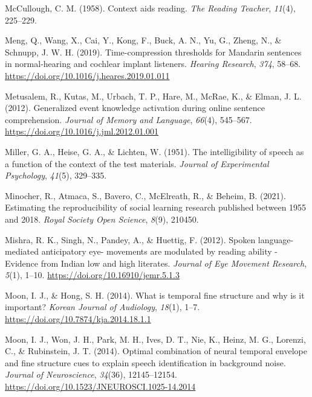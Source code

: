 \documentclass[a4paper, nobind]{templates/ociamthesis}
\newlength{\cslhangindent}
\newenvironment{CSLReferences}[2] %
 {%
  \setlength{\parindent}{0pt}
  \ifodd #1
  \let\oldpar\par
  \def\par{\hangindent=\cslhangindent\oldpar}
  \fi
  \setlength{\parskip}{1mm}
  \setlength{\baselineskip}{6mm}
 }%
 {}
\begin{document}
\begin{CSLReferences}{1}{0}
\leavevmode{}%
McCullough, C. M. (1958). {Context aids reading}. \emph{The Reading Teacher}, \emph{11}(4), 225--229.

\leavevmode{}%
Meng, Q., Wang, X., Cai, Y., Kong, F., Buck, A. N., Yu, G., Zheng, N., \& Schnupp, J. W. H. (2019). {Time-compression thresholds for Mandarin sentences in normal-hearing and cochlear implant listeners}. \emph{Hearing Research}, \emph{374}, 58--68. \url{https://doi.org/10.1016/j.heares.2019.01.011}

\leavevmode{}%
Metusalem, R., Kutas, M., Urbach, T. P., Hare, M., McRae, K., \& Elman, J. L. (2012). Generalized event knowledge activation during online sentence comprehension. \emph{Journal of Memory and Language}, \emph{66}(4), 545--567. \url{https://doi.org/10.1016/j.jml.2012.01.001}

\leavevmode{}%
Miller, G. A., Heise, G. A., \& Lichten, W. (1951). {The intelligibility of speech as a function of the context of the test materials}. \emph{Journal of Experimental Psychology}, \emph{41}(5), 329--335.

\leavevmode{}%
Minocher, R., Atmaca, S., Bavero, C., McElreath, R., \& Beheim, B. (2021). Estimating the reproducibility of social learning research published between 1955 and 2018. \emph{Royal Society Open Science}, \emph{8}(9), 210450.

\leavevmode{}%
Mishra, R. K., Singh, N., Pandey, A., \& Huettig, F. (2012). {Spoken language-mediated anticipatory eye- movements are modulated by reading ability - Evidence from Indian low and high literates}. \emph{Journal of Eye Movement Research}, \emph{5}(1), 1--10. \url{https://doi.org/10.16910/jemr.5.1.3}

\leavevmode{}%
Moon, I. J., \& Hong, S. H. (2014). What is temporal fine structure and why is it important? \emph{Korean Journal of Audiology}, \emph{18}(1), 1--7. \url{https://doi.org/10.7874/kja.2014.18.1.1}

\leavevmode{}%
Moon, I. J., Won, J. H., Park, M. H., Ives, D. T., Nie, K., Heinz, M. G., Lorenzi, C., \& Rubinstein, J. T. (2014). Optimal combination of neural temporal envelope and fine structure cues to explain speech identification in background noise. \emph{Journal of Neuroscience}, \emph{34}(36), 12145--12154. \url{https://doi.org/10.1523/JNEUROSCI.1025-14.2014}


\end{CSLReferences}
\end{document}
